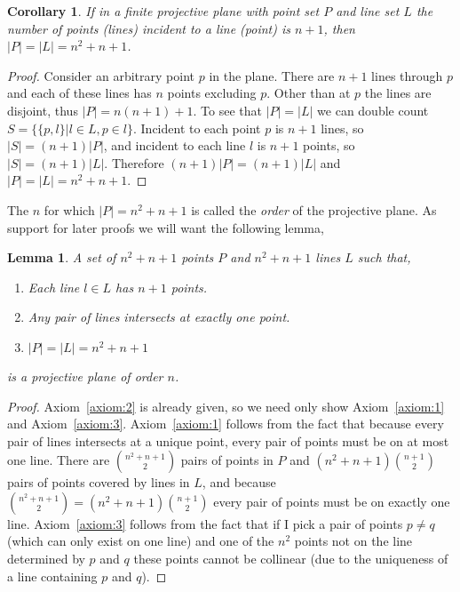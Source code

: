 \documentclass{article}
\newtheorem{lemma}{Lemma}
\newtheorem{corollary}{Corollary}
\begin{document}
\begin{corollary}
  If in a finite projective plane with point set \(P\) and line set \(L\) the number of points (lines) incident to a line (point) is \(n + 1\), then \(|P| = |L| = n^2 + n + 1\).
\end{corollary}
\begin{proof}\label{cor:p-count}
  Consider an arbitrary point \(p\) in the plane. There are \(n + 1\) lines through \(p\) and each of these lines has \(n\) points excluding \(p\). Other than at \(p\) the lines are disjoint, thus \(|P| = n(n + 1) + 1\).
  To see that \(|P| = |L|\) we can double count \(S = \{\{p, l\} | l \in L, p \in l\}\). Incident to each point \(p\) is \(n + 1\) lines, so \(|S| = (n + 1)|P|\), and incident to each line \(l\) is \(n + 1\) points, so \(|S| = (n + 1)|L|\). Therefore \((n + 1)|P| = (n + 1)|L|\) and \(|P| = |L| = n^2 + n + 1\).
\end{proof}

The \(n\) for which \(|P| = n^2 + n + 1\) is called the \textit{order} of the projective plane.
As support for later proofs we will want the following lemma,

\begin{lemma}\label{lemma:easy-proj}
  A set of \(n^{2} + n + 1\) points \(P\) and \(n^{2} + n + 1\) lines \(L\) such that,

  \begin{enumerate}
    \item Each line \(l \in L\) has \(n + 1\) points.
    \item Any pair of lines intersects at exactly one point.
    \item \(|P| = |L| = n^{2} + n + 1\)
  \end{enumerate}

  is a projective plane of order \(n\).
\end{lemma}

\begin{proof}
  Axiom~\ref{axiom:2} is already given, so we need only show Axiom~\ref{axiom:1} and Axiom~\ref{axiom:3}. Axiom~\ref{axiom:1} follows from the fact that because every pair of lines intersects at a unique point, every pair of points must be on at most one line. There are \(\binom{n^{2} + n + 1}{2}\) pairs of points in \(P\) and \((n^{2} + n + 1)\binom{n + 1}{2}\) pairs of points covered by lines in \(L\), and because \(\binom{n^{2} + n + 1}{2} = (n^{2} + n + 1)\binom{n + 1}{2}\) every pair of points must be on exactly one line. Axiom~\ref{axiom:3} follows from the fact that if I pick a pair of points \(p \ne q\) (which can only exist on one line) and one of the \(n^{2}\) points not on the line determined by \(p\) and \(q\) these points cannot be collinear (due to the uniqueness of a line containing \(p\) and \(q\)).
\end{proof}
\end{document}
